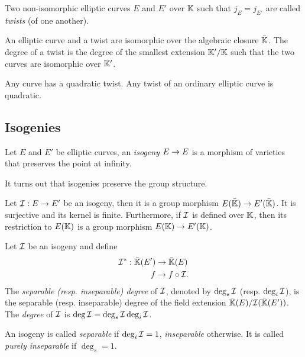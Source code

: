 \begin{definition}[Twist]
  Two non-isomorphic elliptic curves $E$ and $E'$ over $\mathbb{K}$ such that
  $j_E=j_{E'}$ are called \emph{twists} (of one another).
\end{definition}

  An
elliptic curve and a twist are isomorphic over the algebraic closure
$\bar{\mathbb{K}}$. The degree of a twist is the
degree of the smallest extension $\mathbb{K}'/\mathbb{K}$ such that the two curves are
isomorphic over $\mathbb{K}'$.

\begin{proposition}
  Any curve has a quadratic twist. Any twist of an ordinary elliptic
  curve is quadratic.
\end{proposition}


\subsection{Isogenies}
\label{sec:isogenies}

\begin{definition}[Isogeny]
  Let $E$ and $E'$ be elliptic curves, an
  \emph{isogeny} $E\rightarrow E$ is a morphism of varieties
  that preserves the point at infinity.
\end{definition}

It turns out that isogenies preserve the group structure.

\begin{theorem}
  Let $\mathcal{I}:E\rightarrow E'$ be an isogeny, then it is a group morphism
  $E(\bar{\mathbb{K}})\rightarrow E'(\bar{\mathbb{K}})$. It is surjective and its kernel is
  finite. Furthermore, if $\mathcal{I}$ is defined over $\mathbb{K}$, then its
  restriction to $E(\mathbb{K})$ is a group morphism $E(\mathbb{K})\rightarrow E'(\mathbb{K})$.
\end{theorem}

\begin{definition}[Degree]
  Let $\mathcal{I}$ be an isogeny and
  define
  \begin{equation}
    \label{eq:138}
    \begin{aligned}
      \mathcal{I}^\ast:\bar{\mathbb{K}}(E')&\rightarrow\bar{\mathbb{K}}(E)\\
      f &\rightarrow f\circ\mathcal{I}
      \text{.}
    \end{aligned}
  \end{equation}
  The \emph{separable (resp. inseparable) degree} of $\mathcal{I}$, denoted by
  $\deg_s\mathcal{I}$ (resp. $\deg_i\mathcal{I}$), is the separable (resp. inseparable)
  degree of the field extension $\bar{\mathbb{K}}(E)/\mathcal{I}(\bar{\mathbb{K}}(E'))$. The
  \emph{degree} of $\mathcal{I}$ is $\deg\mathcal{I}=\deg_s\mathcal{I}\deg_i\mathcal{I}$.

  An isogeny is called \emph{separable} if
  $\deg_i\mathcal{I}=1$, \emph{inseparable}
  otherwise. It is called
  \emph{purely inseparable} if
  $\deg_s=1$.
\end{definition}

